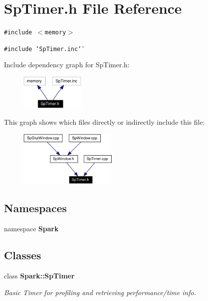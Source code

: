 \section{Sp\-Timer.h File Reference}
\label{SpTimer_8h}
{\tt \#include $<$memory$>$}\par
{\tt \#include \char`\"{}Sp\-Timer.inc\char`\"{}}\par


Include dependency graph for Sp\-Timer.h:\begin{figure}[H]
\begin{center}
\leavevmode
\includegraphics[width=88pt]{SpTimer_8h__incl}
\end{center}
\end{figure}


This graph shows which files directly or indirectly include this file:\begin{figure}[H]
\begin{center}
\leavevmode
\includegraphics[width=134pt]{SpTimer_8h__dep__incl}
\end{center}
\end{figure}
\subsection*{Namespaces}
\begin{CompactItemize}
\item 
namespace {\bf Spark}
\end{CompactItemize}
\subsection*{Classes}
\begin{CompactItemize}
\item 
class {\bf Spark::Sp\-Timer}
\begin{CompactList}\small\item\em Basic Timer for profiling and retrieving performance/time info. \item\end{CompactList}\end{CompactItemize}
